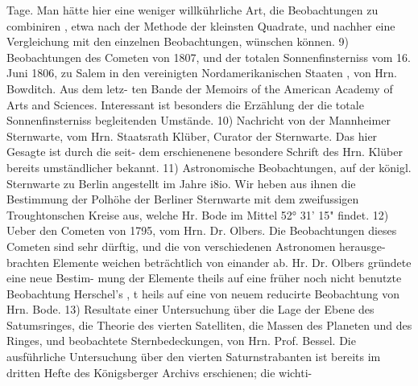 \documentclass[12pt,a4paper]{article}
\begin{document}
Tage. Man hätte hier eine weniger willkührliche Art, die Beobachtungen zu combiniren , etwa nach\newline
der Methode der kleinsten Quadrate, und nachher eine Vergleichung mit den einzelnen Beobachtungen,\newline
wünschen können. 9) Beobachtungen des Cometen von 1807, und der totalen Sonnenfinsterniss vom 16.\newline
Juni 1806, zu Salem in den vereinigten Nordamerikanischen Staaten , von Hrn. Bowditch. Aus dem letz-\newline
ten Bande der Memoirs of the American Academy of Arts and Sciences. Interessant ist besonders die\newline
Erzählung der die totale Sonnenfinsterniss begleitenden Umstände. 10) Nachricht von der Mannheimer\newline
Sternwarte, vom Hrn. Staatsrath Klüber, Curator der Sternwarte. Das hier Gesagte ist durch die seit-\newline
dem erschienenene besondere Schrift des Hrn. Klüber bereits umständlicher bekannt. 11) Astronomische\newline
Beobachtungen, auf der königl. Sternwarte zu Berlin angestellt im Jahre i8io. Wir heben aus ihnen\newline
die Bestimmung der Polhöhe der Berliner Sternwarte mit dem zweifussigen Troughtonschen Kreise aus,\newline
welche Hr. Bode im Mittel 52° 31' 15" findet. 12) Ueber den Cometen von 1795, vom Hrn. Dr. Olbers.\newline
Die Beobachtungen dieses Cometen sind sehr dürftig, und die von verschiedenen Astronomen herausge-\newline
brachten Elemente weichen beträchtlich von einander ab. Hr. Dr. Olbers gründete eine neue Bestim-\newline
mung der Elemente theils auf eine früher noch nicht benutzte Beobachtung Herschel's , t heils auf eine\newline
von neuem reducirte Beobachtung von Hrn. Bode. 13) Resultate einer Untersuchung über die Lage der\newline
Ebene des Satumsringes, die Theorie des vierten Satelliten, die Massen des Planeten und des Ringes,\newline
und beobachtete Sternbedeckungen, von Hrn. Prof. Bessel. Die ausführliche Untersuchung über den\newline
vierten Saturnstrabanten ist bereits im dritten Hefte des Königsberger Archivs erschienen; die wichti-\newline
\end{document}
